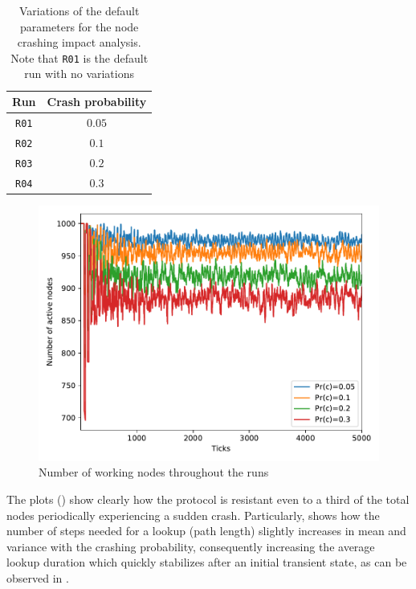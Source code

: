 \documentclass[11pt,twocolumn,letterpaper]{article}
\begin{document}
		\begin{table}[h!]
			\caption{Variations of the default parameters for the node crashing impact analysis. Note that \texttt{R01} is the default run with no variations}
			\label{tab:crash_runs}
			\centering
			\begin{tabular}{cc}
				\hline
				\textbf{Run} & \textbf{Crash probability}\\
				\hline
				\texttt{R01} & $0.05$\\
				\hline
				\texttt{R02} & $0.1$\\
				\hline
				\texttt{R03} & $0.2$\\
				\hline
				\texttt{R04} & $0.3$\\
				\hline
			\end{tabular}
		\end{table}
		\begin{figure}[h]
			\centering
			\includegraphics[width=\linewidth,clip,trim=0 0.5cm 0 0.35cm]{figures/analysis1/nodesup_time.pdf}
			\caption{Number of working nodes throughout the runs}
			\label{fig:crash0}
		\end{figure}

		The plots () show clearly how the protocol is resistant even to a third of the total nodes periodically experiencing a sudden crash. Particularly,  shows how the number of steps needed for a lookup (path length) slightly increases in mean and variance with the crashing probability, consequently increasing the average lookup duration which quickly stabilizes after an initial transient state, as can be observed in . 
\end{document}
